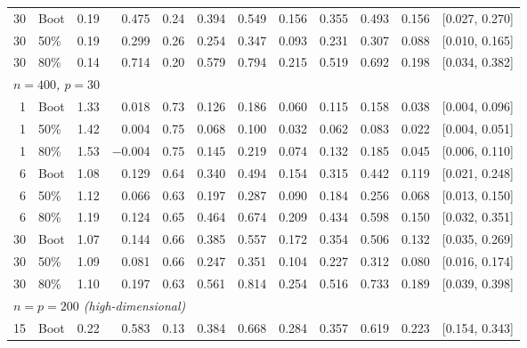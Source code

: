 \documentclass[11pt]{article}
\theoremstyle{plain}
\theoremstyle{definition}
\theoremstyle{remark}
\begin{document}
\begin{table}[htbp!]
\begin{tabular}{rlrrrrrrrrrl}
		30 & Boot & 0.19 & 0.475    & 0.24 & 0.394 & 0.549 & 0.156 & 0.355 & 0.493 & 0.156 & [0.027, 0.270] \\
		30 & 50\% & 0.19 & 0.299    & 0.26 & 0.254 & 0.347 & 0.093 & 0.231 & 0.307 & 0.088 & [0.010, 0.165] \\
		30 & 80\% & 0.14 & 0.714    & 0.20 & 0.579 & 0.794 & 0.215 & 0.519 & 0.692 & 0.198 & [0.034, 0.382] \\[4pt]
		\multicolumn{12}{l}{\textit{$n = 400$, $p = 30$}} \\[2pt]
		1  & Boot & 1.33 & 0.018    & 0.73 & 0.126 & 0.186 & 0.060 & 0.115 & 0.158 & 0.038 & [0.004, 0.096] \\
		1  & 50\% & 1.42 & 0.004    & 0.75 & 0.068 & 0.100 & 0.032 & 0.062 & 0.083 & 0.022 & [0.004, 0.051] \\
		1  & 80\% & 1.53 & $-$0.004 & 0.75 & 0.145 & 0.219 & 0.074 & 0.132 & 0.185 & 0.045 & [0.006, 0.110] \\
		6  & Boot & 1.08 & 0.129    & 0.64 & 0.340 & 0.494 & 0.154 & 0.315 & 0.442 & 0.119 & [0.021, 0.248] \\
		6  & 50\% & 1.12 & 0.066    & 0.63 & 0.197 & 0.287 & 0.090 & 0.184 & 0.256 & 0.068 & [0.013, 0.150] \\
		6  & 80\% & 1.19 & 0.124    & 0.65 & 0.464 & 0.674 & 0.209 & 0.434 & 0.598 & 0.150 & [0.032, 0.351] \\
		30 & Boot & 1.07 & 0.144    & 0.66 & 0.385 & 0.557 & 0.172 & 0.354 & 0.506 & 0.132 & [0.035, 0.269] \\
		30 & 50\% & 1.09 & 0.081    & 0.66 & 0.247 & 0.351 & 0.104 & 0.227 & 0.312 & 0.080 & [0.016, 0.174] \\
		30 & 80\% & 1.10 & 0.197    & 0.63 & 0.561 & 0.814 & 0.254 & 0.516 & 0.733 & 0.189 & [0.039, 0.398] \\[4pt]
		\multicolumn{12}{l}{\textit{$n = p = 200$ (high-dimensional)}} \\[2pt]
		15 & Boot & 0.22 & 0.583    & 0.13 & 0.384 & 0.668 & 0.284 & 0.357 & 0.619 & 0.223 & [0.154, 0.343] \\
		\hline
	\end{tabular}
\end{table}

\newpage
\end{document}
